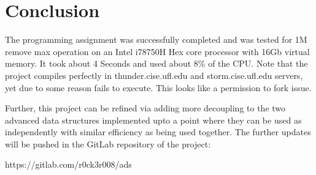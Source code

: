 \documentclass[conference,a4paper,12pt]{IEEEtran}
\begin{document}
\section{Conclusion}
The programming assignment was successfully completed and was tested for 1M remove max operation on an Intel i7\-8750H Hex core processor with 16Gb virtual memory. It took about 4 Seconds and used about 8\% of the CPU. Note that the project compiles perfectly in thunder.cise.ufl.edu and storm.cise.ufl.edu  servers, yet due to some reason fails to execute. This looks like a permission to fork issue.

Further, this project can be refined via adding more decoupling to the two advanced data structures implemented upto a point where they can be used as independently with similar efficiency as being used together. The further updates will be pushed in the GitLab repository of the project:

\begin{center}
https://gitlab.com/r0ck3r008/ads
\end{center}
\end{document}
